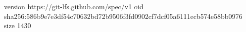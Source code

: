 version https://git-lfs.github.com/spec/v1
oid sha256:586b9e7e3df54c70632bd72b9506f3fd0902cf7dcf05a6111ecb574e58bb0976
size 1430
